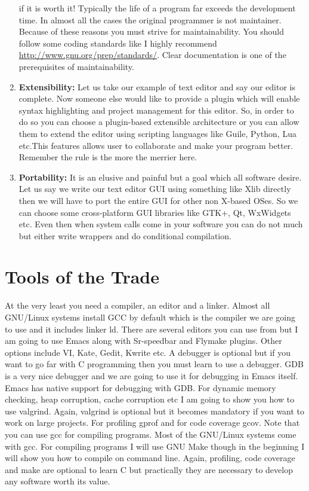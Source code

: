 \begin{enumerate}
  if it is worth it! Typically the life of a program far exceeds the
  development time. In almost all the cases the original programmer is not
  maintainer. Because of these reasons you must strive for maintainability. You
  should follow some coding standards like I highly recommend
  \url{http://www.gnu.org/prep/standards/}. Clear documentation is one of the
  prerequisites of maintainability.
\item \textbf{Extensibility:} Let us take our example of text editor and say
  our editor is complete. Now someone else would like to provide a plugin which
  will enable syntax highlighting and project management for this editor. So,
  in order to do so you can choose a plugin-based extensible architecture or
  you can allow them to extend the editor using scripting languages like Guile,
  Python, Lua etc.This features allows user to collaborate and make your
  program better. Remember the rule is the more the merrier here.
\item \textbf{Portability:} It is an elusive and painful but a goal which all
  software desire. Let us say we write our text editor GUI using something like
  Xlib directly then we will have to port the entire GUI for other non X-based
  OSes. So we can choose some cross-platform GUI libraries like GTK+, Qt,
  WxWidgets etc. Even then when system calls come in your software you can do
  not much but either write wrappers and do conditional compilation.
\end{enumerate}

\section{Tools of the Trade}
At the very least you need a compiler, an editor and a linker. Almost all
GNU/Linux systems install GCC by default which is the compiler we are going to
use and it includes linker ld. There are several editors you can use from but I
am going to use Emacs along with Sr-speedbar and Flymake plugins. Other options
include VI, Kate, Gedit, Kwrite etc. A debugger is optional but if you want to
go far with C programming then you must learn to use a debugger. GDB is a very
nice debugger and we are going to use it for debugging in Emacs itself. Emacs
has native support for debugging with GDB. For dynamic memory checking, heap
corruption, cache corruption etc I am going to show you how to use
valgrind. Again, valgrind is optional but it becomes mandatory if you want to
work on large projects. For profiling gprof and for code coverage gcov. Note
that you can use gcc for compiling programs. Most of the GNU/Linux systems come
with gcc. For compiling programs I will use GNU Make though in the beginning I
will show you how to compile on command line. Again, profiling, code coverage
and make are optional to learn C but practically they are necessary to develop
any software worth its value.

